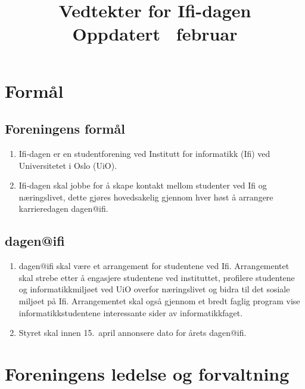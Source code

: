 \documentclass[norsk,a4paper]{article}
\author{}%
\title{\textbf{Vedtekter for Ifi-dagen} \\
{\large Oppdatert \DIFdelbegin \DIFdel{etter generalforsamlingen 15.}\DIFdelend \DIFaddbegin \DIFadd{for generalforsamlingen 28.}\DIFaddend \ februar \DIFdelbegin \DIFdel{2017}\DIFdelend \DIFaddbegin \DIFadd{2018}\DIFaddend }}
\date{}%
\begin{document}
\maketitle{}
\thispagestyle{fancy}

\section{Formål}
\subsection{Foreningens formål}
\begin{enumerate}
	\item{Ifi-dagen er en studentforening ved Institutt for informatikk (Ifi) ved Universitetet i Oslo (UiO).}
	\item{Ifi-dagen skal jobbe for å skape kontakt mellom studenter ved Ifi og næringslivet, dette gjøres hovedsakelig gjennom hver høst å arrangere karrieredagen dagen@ifi.}
\end{enumerate}
\subsection{dagen@ifi}
\begin{enumerate}
	\item{dagen@ifi skal være et arrangement for studentene ved Ifi. Arrangementet skal strebe etter å engasjere studentene ved instituttet, profilere studentene og informatikkmiljøet ved UiO overfor næringslivet og bidra til det sosiale miljøet på Ifi. Arrangementet skal også gjennom et bredt faglig program vise informatikkstudentene interessante sider av informatikkfaget.}
	\item{Styret skal innen 15.\ april annonsere dato for årets dagen@ifi.}
\end{enumerate}

\section{Foreningens ledelse og forvaltning}
\end{document}
